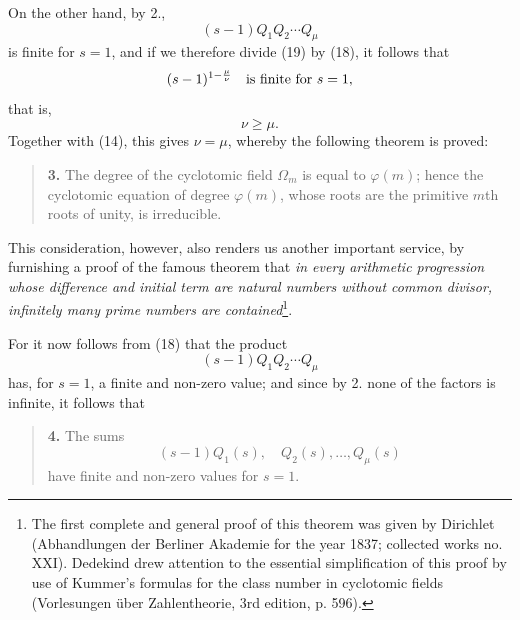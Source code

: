 \documentclass[11pt]{article}
\begin{document}
On the other hand, by 2.,
\begin{equation}\tag{19}
(s-1)Q_1Q_2\cdots Q_\mu
\end{equation}
is finite for $s=1$, and if we therefore divide (19) by (18), it follows that
\[
(s-1)^{1-\frac{\mu}{\nu}}\quad\hbox{is finite for }s=1,
\]
that is,
\begin{equation}\tag{20}
\nu\geq\mu.
\end{equation}
Together with (14), this gives $\nu=\mu$, whereby the following theorem is proved:

\begin{quote}
\textbf{3.} The degree of the cyclotomic field $\Omega_m$ is equal to $\varphi(m)$; hence the cyclotomic equation of degree $\varphi(m)$, whose roots are the primitive $m$th roots of unity, is irreducible.
\end{quote}

This consideration, however, also renders us another important service, by furnishing a proof of the famous theorem that \emph{in every arithmetic progression whose difference and initial term are natural numbers without common divisor, infinitely many prime numbers are contained}\footnote{The first complete and general proof of this theorem was given by Dirichlet (Abhandlungen der Berliner Akademie for the year 1837; collected works no. XXI). Dedekind drew attention to the essential simplification of this proof by use of Kummer's formulas for the class number in cyclotomic fields (Vorlesungen über Zahlentheorie, 3rd edition, p. 596).}.

For it now follows from (18) that the product
\[
(s-1)Q_1Q_2\cdots Q_\mu
\]
has, for $s=1$, a finite and non-zero value; and since by 2. none of the factors is infinite, it follows that
\begin{quote}
\textbf{4.} The sums
\[
(s-1)Q_1(s),\quad Q_2(s),\ldots,Q_\mu(s)
\]
have finite and non-zero values for $s=1$.
\end{quote}
\end{document}
